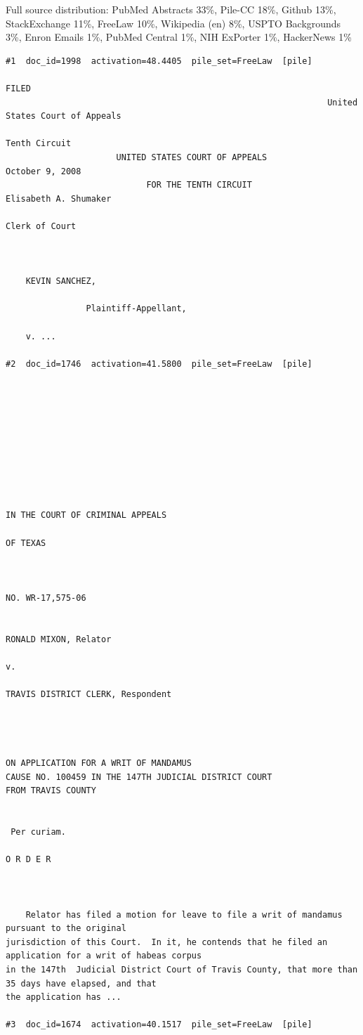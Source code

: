 Full source distribution: PubMed Abstracts 33\%, Pile-CC 18\%, Github 13\%, StackExchange 11\%, FreeLaw 10\%, Wikipedia (en) 8\%, USPTO Backgrounds 3\%, Enron Emails 1\%, PubMed Central 1\%, NIH ExPorter 1\%, HackerNews 1\%

\begin{verbatim}
#1  doc_id=1998  activation=48.4405  pile_set=FreeLaw  [pile]
                                                                            FILED
                                                                United States Court of Appeals
                                                                        Tenth Circuit
                      UNITED STATES COURT OF APPEALS                  October 9, 2008
                            FOR THE TENTH CIRCUIT                   Elisabeth A. Shumaker
                                                                        Clerk of Court



    KEVIN SANCHEZ,

                Plaintiff-Appellant,

    v. ...

#2  doc_id=1746  activation=41.5800  pile_set=FreeLaw  [pile]










IN THE COURT OF CRIMINAL APPEALS

OF TEXAS



NO. WR-17,575-06


RONALD MIXON, Relator

v.

TRAVIS DISTRICT CLERK, Respondent




ON APPLICATION FOR A WRIT OF MANDAMUS
CAUSE NO. 100459 IN THE 147TH JUDICIAL DISTRICT COURT
FROM TRAVIS COUNTY


 Per curiam.

O R D E R



	Relator has filed a motion for leave to file a writ of mandamus pursuant to the original
jurisdiction of this Court.  In it, he contends that he filed an application for a writ of habeas corpus
in the 147th  Judicial District Court of Travis County, that more than 35 days have elapsed, and that
the application has ...

#3  doc_id=1674  activation=40.1517  pile_set=FreeLaw  [pile]


\end{verbatim}
